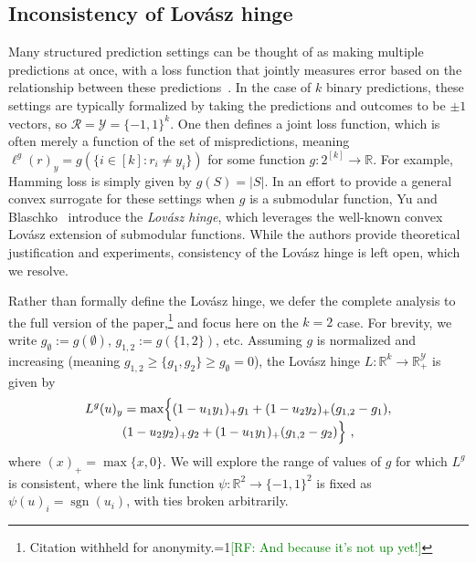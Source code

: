 \documentclass[12pt]{article}
\newcommand{\Comments}{1}
\newcommand{\mynote}[2]{\ifnum\Comments=1\textcolor{#1}{#2}\fi}
\newcommand{\mytodo}[2]{\ifnum\Comments=1%
  \todo[linecolor=#1!80!black,backgroundcolor=#1,bordercolor=#1!80!black]{#2}\fi}
\newcommand{\raf}[1]{\mynote{green}{[RF: #1]}}
\newcommand{\raft}[1]{\mytodo{green!20!white}{RF: #1}}
\newcommand{\reals}{\mathbb{R}}
\newcommand{\R}{\mathcal{R}}
\newcommand{\Y}{\mathcal{Y}}
\DeclareMathOperator*{\sgn}{sgn}
\begin{document}
\subsection{Inconsistency of Lov\'asz hinge}
\label{sec:lovasz-hinge}

Many structured prediction settings can be thought of as making multiple predictions at once, with a loss function that jointly measures error based on the relationship between these predictions~\cite{hazan2010direct, gao2011consistency, osokin2017structured}.
In the case of $k$ binary predictions, these settings are typically formalized by taking the predictions and outcomes to be $\pm 1$ vectors, so $\R=\Y=\{-1,1\}^k$.
One then defines a joint loss function, which is often merely a function of the set of mispredictions, meaning $\ell^g(r)_y = g(\{i \in [k] : r_i \neq y_i\})$ for some function $g:2^{[k]}\to\reals$.
For example, Hamming loss is simply given by $g(S) = |S|$.
In an effort to provide a general convex surrogate for these settings when $g$ is a submodular function, Yu and Blaschko~\cite{yu2018lovasz} introduce the \emph{Lov\'asz hinge}, which leverages the well-known convex Lov\'asz extension of submodular functions.
While the authors provide theoretical justification and experiments, consistency of the Lov\'asz hinge is left open, which we resolve.

Rather than formally define the Lov\'asz hinge, we defer the complete analysis to the full version of the paper,\footnote{Citation withheld for anonymity.\raf{And because it's not up yet!}} and focus here on the $k=2$ case.
For brevity, we write $g_\emptyset := g(\emptyset)$, $g_{1,2} := g(\{1,2\})$, etc.
Assuming $g$ is normalized and increasing (meaning $g_{1,2} \geq \{g_1,g_2\} \geq g_\emptyset = 0$), the Lov\'asz hinge $L:\reals^k\to\reals^\Y_+$ is given by
\begin{multline}
  \label{eq:lovasz-hinge}
  L^g(u)_y = \max\Bigl\{(1-u_1y_1)_+ g_1 + (1-u_2y_2)_+ (g_{1,2}-g_1),\\[-4pt] (1-u_2y_2)_+ g_2 + (1-u_1y_1)_+ (g_{1,2}-g_2)\Bigr\}~,
\end{multline}
where $(x)_+ = \max\{x,0\}$.
We will explore the range of values of $g$ for which $L^g$ is consistent, where the link function $\psi:\reals^2\to\{-1,1\}^2$ is fixed as $\psi(u)_i = \sgn(u_i)$, with ties broken arbitrarily.
\end{document}
